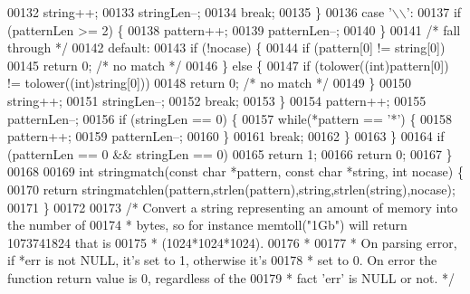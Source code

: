 \begin{DoxyCode}
00132             string++;
00133             stringLen--;
00134             \textcolor{keywordflow}{break};
00135         \}
00136         \textcolor{keywordflow}{case} \textcolor{stringliteral}{'\(\backslash\)\(\backslash\)'}:
00137             \textcolor{keywordflow}{if} (patternLen >= 2) \{
00138                 pattern++;
00139                 patternLen--;
00140             \}
00141             \textcolor{comment}{/* fall through */}
00142         \textcolor{keywordflow}{default}:
00143             \textcolor{keywordflow}{if} (!nocase) \{
00144                 \textcolor{keywordflow}{if} (pattern[0] != string[0])
00145                     \textcolor{keywordflow}{return} 0; \textcolor{comment}{/* no match */}
00146             \} \textcolor{keywordflow}{else} \{
00147                 \textcolor{keywordflow}{if} (tolower((\textcolor{keywordtype}{int})pattern[0]) != tolower((\textcolor{keywordtype}{int})string[0]))
00148                     \textcolor{keywordflow}{return} 0; \textcolor{comment}{/* no match */}
00149             \}
00150             string++;
00151             stringLen--;
00152             \textcolor{keywordflow}{break};
00153         \}
00154         pattern++;
00155         patternLen--;
00156         \textcolor{keywordflow}{if} (stringLen == 0) \{
00157             \textcolor{keywordflow}{while}(*pattern == \textcolor{stringliteral}{'*'}) \{
00158                 pattern++;
00159                 patternLen--;
00160             \}
00161             \textcolor{keywordflow}{break};
00162         \}
00163     \}
00164     \textcolor{keywordflow}{if} (patternLen == 0 && stringLen == 0)
00165         \textcolor{keywordflow}{return} 1;
00166     \textcolor{keywordflow}{return} 0;
00167 \}
00168 
00169 \textcolor{keywordtype}{int} stringmatch(\textcolor{keyword}{const} \textcolor{keywordtype}{char} *pattern, \textcolor{keyword}{const} \textcolor{keywordtype}{char} *string, \textcolor{keywordtype}{int} nocase) \{
00170     \textcolor{keywordflow}{return} stringmatchlen(pattern,strlen(pattern),string,strlen(string),nocase);
00171 \}
00172 
00173 \textcolor{comment}{/* Convert a string representing an amount of memory into the number of}
00174 \textcolor{comment}{ * bytes, so for instance memtoll("1Gb") will return 1073741824 that is}
00175 \textcolor{comment}{ * (1024*1024*1024).}
00176 \textcolor{comment}{ *}
00177 \textcolor{comment}{ * On parsing error, if *err is not NULL, it's set to 1, otherwise it's}
00178 \textcolor{comment}{ * set to 0. On error the function return value is 0, regardless of the}
00179 \textcolor{comment}{ * fact 'err' is NULL or not. */}

\end{DoxyCode}
